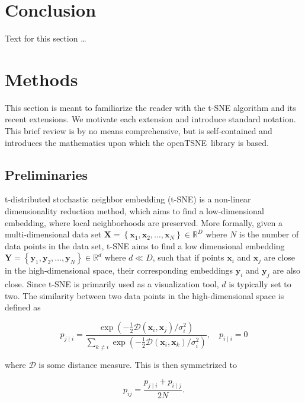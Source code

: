 \documentclass[twocolumn]{article}
\newcommand{\opentsne}{\textsf{openTSNE}}
\begin{document}
\section*{Conclusion}
Text for this section \ldots


\fontsize{8}{10}\selectfont
\section*{Methods}

This section is meant to familiarize the reader with the t-SNE algorithm and its
recent extensions. We motivate each extension and introduce standard notation.
This brief review is by no means comprehensive, but is self-contained and
introduces the mathematics upon which the \opentsne\ library is based.

\subsection*{Preliminaries}

t-distributed stochastic neighbor embedding (t-SNE) is a non-linear
dimensionality reduction method, which aims to find a low-dimensional
embedding, where local neighborhoods are preserved. More formally, given a
multi-dimensional data set $\mathbf{X} = \left \{ \mathbf{x}_1, \mathbf{x}_2,
\dots, \mathbf{x}_N \right \} \in \mathbb{R}^D$ where $N$ is the number of data
points in the data set, t-SNE aims to find a low dimensional embedding
$\mathbf{Y} = \left \{ \mathbf{y}_1, \mathbf{y}_2, \dots, \mathbf{y}_N \right
\} \in \mathbb{R}^d$ where $d \ll D$, such that if points $\mathbf{x}_i$ and
$\mathbf{x}_j$ are close in the high-dimensional space, their corresponding
embeddings $\mathbf{y}_i$ and $\mathbf{y}_j$ are also close. Since t-SNE is
primarily used as a visualization tool, $d$ is typically set to two. The
similarity between two data points in the high-dimensional space is defined as

\begin{equation}
p_{j \mid i} = \frac{\exp \left ( -\frac{1}{2} \mathcal{D}(\mathbf{x}_i, \mathbf{x}_j ) / \sigma_i^2 \right )}
{\sum_{k \neq i } \exp \left ( -\frac{1}{2} \mathcal{D}(\mathbf{x}_i, \mathbf{x}_k ) / \sigma_i^2 \right )}, \quad p_{i \mid i} = 0
\label{eq:gaussian_kernel}
\end{equation}

\noindent where $\mathcal{D}$ is some distance measure. This is then
symmetrized to

\begin{equation}
p_{ij} = \frac{p_{j \mid i} + p_{i \mid j}}{2N}.
\label{eq:symmetrize}
\end{equation}
\end{document}
